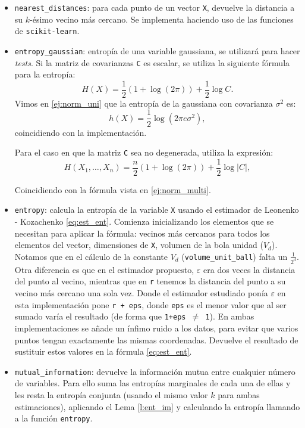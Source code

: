 \documentclass[12pt,a4paper]{report} %
\theoremstyle{definition}
\begin{document}
\begin{itemize}
\item \texttt{nearest\_distances}: para cada punto de un vector \texttt{X}, devuelve la distancia a su $k$-ésimo vecino más cercano. Se implementa haciendo uso de las funciones de \texttt{scikit-learn}.

\item \texttt{entropy\_gaussian}: entropía de una variable gaussiana, se utilizará para hacer \textit{tests}. Si la matriz de covarianzas \texttt{C} es escalar, se utiliza la siguiente fórmula para la entropía:\[
  H(X) = \frac{1}{2}\left ( 1 + \log(2\pi) \right )+ \frac{1}{2} \log C.
  \]
Vimos en \ref{ej:norm_uni} que la entropía de la gaussiana con covarianza $\sigma^2$ es:\[
h(X) = \frac{1}{2}\log (2\pi e \sigma^2 ),
\]
coincidiendo con la implementación.

Para el caso en que la matriz \texttt{C} sea no degenerada, utiliza la expresión:\[
H(X_1,\dots, X_n) = \frac{n}{2} \left (1 + \log(2\pi) \right) + \frac{1}{2}\log |C|,
\]

Coincidiendo con la fórmula vista en \ref{ej:norm_multi}.

\item \texttt{entropy}: calcula la entropía de la variable \texttt{X} usando el estimador de Leonenko - Kozachenko \ref{eq:est_ent}. Comienza inicializando los elementos que se necesitan para aplicar la fórmula: vecinos más cercanos para todos los elementos del vector, dimensiones de \texttt{X}, volumen de la bola unidad ($V_d$). Notamos que en el cálculo de la constante $V_d$ (\texttt{volume\_unit\_ball}) falta un $\frac{1}{2^d}$. Otra diferencia es que en el estimador propuesto, $\varepsilon$ era dos veces la distancia del punto al vecino, mientras que en \texttt{r} tenemos la distancia del punto a su vecino más cercano una sola vez. Donde el estimador estudiado ponía $\varepsilon$ en esta implementación pone \texttt{r + eps}, donde \texttt{eps} es el menor valor que al ser sumado varía el resultado (de forma que  \texttt{1+eps $\neq$ 1}). En ambas implementaciones se añade un ínfimo ruido a los datos, para evitar que varios puntos tengan exactamente las mismas coordenadas. Devuelve el resultado de sustituir estos valores en la fórmula \ref{eq:est_ent}.

\item \texttt{mutual\_information}: devuelve la información mutua entre cualquier número de variables. Para ello suma las entropías marginales de cada una de ellas y les resta la entropía conjunta (usando el mismo valor $k$ para ambas estimaciones), aplicando el Lema \ref{l:ent_im} y calculando la entropía llamando a la función \texttt{entropy}.


\end{itemize}
\end{document}
